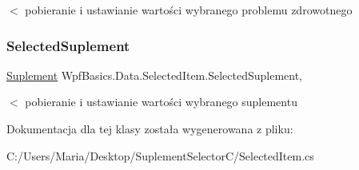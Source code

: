 $<$ pobieranie i ustawianie wartości wybranego problemu zdrowotnego \mbox{\label{class_wpf_basics_1_1_data_1_1_selected_item_ab38632718367f7402e49c68bf020913d}} 
\subsubsection{\texorpdfstring{Selected\+Suplement}{SelectedSuplement}}
{\footnotesize\ttfamily \hyperlink{class_wpf_basics_1_1_data_1_1_suplement}{Suplement} Wpf\+Basics.\+Data.\+Selected\+Item.\+Selected\+Suplement\hspace{0.3cm}{\ttfamily [get]}, {\ttfamily [set]}}

$<$ pobieranie i ustawianie wartości wybranego suplementu 

Dokumentacja dla tej klasy została wygenerowana z pliku\+:\begin{DoxyCompactItemize}
\item 
C\+:/\+Users/\+Maria/\+Desktop/\+Suplement\+Selector\+C/Selected\+Item.\+cs\end{DoxyCompactItemize}
